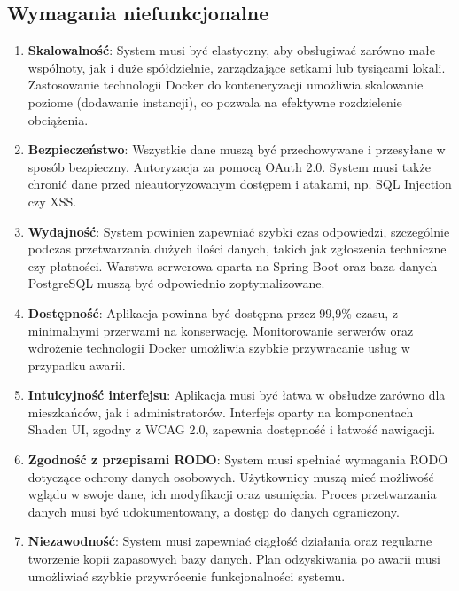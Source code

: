 \subsection{Wymagania niefunkcjonalne}

\begin{enumerate}[label=\arabic*.]

   \item \textbf{Skalowalność}: System musi być elastyczny, aby obsługiwać zarówno małe wspólnoty, jak i duże spółdzielnie, zarządzające setkami lub tysiącami lokali. Zastosowanie technologii Docker do konteneryzacji umożliwia skalowanie poziome (dodawanie instancji), co pozwala na efektywne rozdzielenie obciążenia.

	\item \textbf{Bezpieczeństwo}: Wszystkie dane muszą być przechowywane i przesyłane w sposób bezpieczny. Autoryzacja za pomocą OAuth 2.0. System musi także chronić dane przed nieautoryzowanym dostępem i atakami, np. SQL Injection czy XSS.

	\item \textbf{Wydajność}: System powinien zapewniać szybki czas odpowiedzi, szczególnie podczas przetwarzania dużych ilości danych, takich jak zgłoszenia techniczne czy płatności. Warstwa serwerowa oparta na Spring Boot oraz baza danych PostgreSQL muszą być odpowiednio zoptymalizowane.

	\item \textbf{Dostępność}: Aplikacja powinna być dostępna przez 99,9\% czasu, z minimalnymi przerwami na konserwację. Monitorowanie serwerów oraz wdrożenie technologii Docker umożliwia szybkie przywracanie usług w przypadku awarii.

	\item \textbf{Intuicyjność interfejsu}: Aplikacja musi być łatwa w obsłudze zarówno dla mieszkańców, jak i administratorów. Interfejs oparty na komponentach Shadcn UI, zgodny z WCAG 2.0, zapewnia dostępność i łatwość nawigacji.

	\item \textbf{Zgodność z przepisami RODO}: System musi spełniać wymagania RODO dotyczące ochrony danych osobowych. Użytkownicy muszą mieć możliwość wglądu w swoje dane, ich modyfikacji oraz usunięcia. Proces przetwarzania danych musi być udokumentowany, a dostęp do danych ograniczony.

	\item \textbf{Niezawodność}: System musi zapewniać ciągłość działania oraz regularne tworzenie kopii zapasowych bazy danych. Plan odzyskiwania po awarii musi umożliwiać szybkie przywrócenie funkcjonalności systemu.


\end{enumerate}
